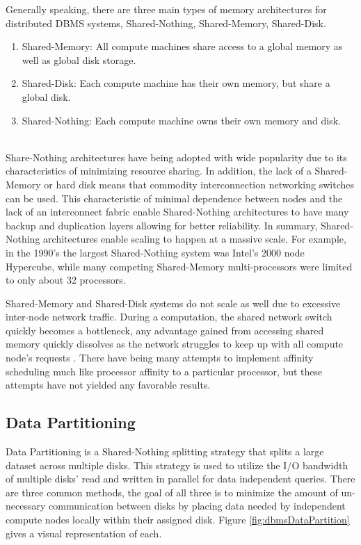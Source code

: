 \documentclass[10pt,twocolumn]{IEEEtran11}
\begin{document}
Generally speaking, there are three main types of memory 
architectures for distributed DBMS systems, Shared-Nothing, Shared-Memory, Shared-Disk.
\  \\
\begin{enumerate}
\setlength\itemsep{1em}
\item Shared-Memory: All compute machines share access to a global memory as well as global disk storage.  
\item Shared-Disk: Each compute machine has their own memory, but share a global disk.
\item Shared-Nothing: Each compute machine owns their own memory and disk. 
\end{enumerate}
\ \\
Share-Nothing architectures have being adopted with wide popularity due to its characteristics of minimizing resource sharing.  In addition, the lack of a Shared-Memory or hard disk means that commodity interconnection networking switches can be used.  This characteristic of minimal dependence between nodes and the lack of an interconnect fabric enable Shared-Nothing architectures to have many backup and duplication layers allowing for better reliability.  In summary, Shared-Nothing architectures enable scaling to happen at a massive scale.  For example, in the 1990's the largest Shared-Nothing system was Intel's 2000 node Hypercube, while many competing Shared-Memory multi-processors were limited to only about 32 processors. 
\par
Shared-Memory and Shared-Disk systems do not scale as well due to excessive inter-node network traffic.  During a computation, the shared network switch quickly becomes a bottleneck, any advantage gained from accessing shared memory quickly dissolves as the network struggles to keep up with all compute node's requests \cite{thakkar1990performance}.  There have being many attempts to implement affinity scheduling much like processor affinity to a particular processor, but these attempts have not yielded any favorable results.  
\subsection{Data Partitioning}

Data Partitioning is a Shared-Nothing splitting strategy that splits a large dataset across multiple disks.  This strategy is used to utilize the I/O bandwidth of multiple disks' read and written in parallel for data independent queries.  There are three common methods, the goal of all three is to minimize the amount of un-necessary communication between disks by placing data needed by independent compute nodes locally within their assigned disk. Figure \ref{fig:dbmsDataPartition} gives a visual representation of each.
\end{document}
